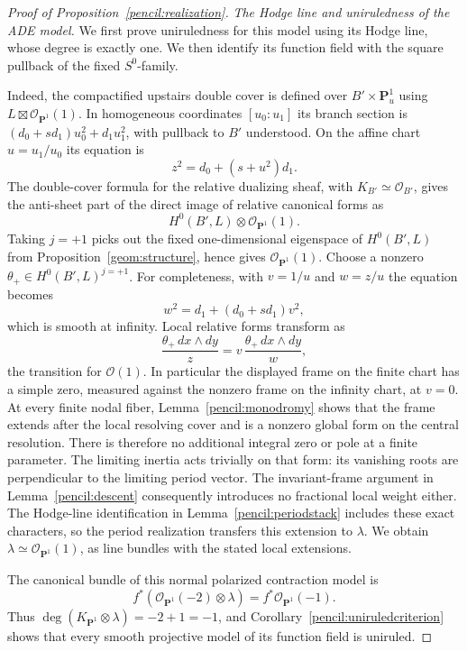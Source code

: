 \documentclass[11pt]{amsart}
\newcommand{\PP}{\mathbf P}
\theoremstyle{definition}
\theoremstyle{remark}
\numberwithin{equation}{section}
\begin{document}
\begin{proof}[Proof of Proposition~\ref{pencil:realization}]
\emph{The Hodge line and uniruledness of the ADE model.}
We first prove uniruledness for this model using its Hodge line, whose
degree is exactly one.  We then identify its function field with the
square pullback of the fixed \(S^0\)-family.

Indeed, the compactified
upstairs double cover is defined over \(B'\times\PP^1_u\) using
\(L\boxtimes\mathcal O_{\PP^1}(1)\).  In homogeneous coordinates
\([u_0:u_1]\) its branch section is
\((d_0+s d_1)u_0^2+d_1u_1^2\), with pullback to \(B'\) understood.
On the affine chart \(u=u_1/u_0\) its equation is
\[
 z^2=d_0+(s+u^2)d_1.
\]
The double-cover formula for the relative dualizing sheaf, with
\(K_{B'}\simeq\mathcal O_{B'}\), gives the anti-sheet part of the
direct image of relative canonical forms as
\[
 H^0(B',L)\otimes\mathcal O_{\PP^1}(1).
\]
Taking \(j=+1\) picks out the fixed one-dimensional eigenspace of
\(H^0(B',L)\) from Proposition~\ref{geom:structure}, hence gives
\(\mathcal O_{\PP^1}(1)\).
Choose a nonzero \(\theta_+\in H^0(B',L)^{j=+1}\).
For completeness, with \(v=1/u\) and \(w=z/u\) the equation becomes
\[
 w^2=d_1+(d_0+s d_1)v^2,
\]
which is smooth at infinity.  Local relative forms transform as
\[
 \frac{\theta_+\,dx\wedge dy}{z}
     =v\,\frac{\theta_+\,dx\wedge dy}{w},
\]
the transition for \(\mathcal O(1)\).  In particular the displayed
frame on the finite chart has a simple zero, measured against the
nonzero frame on the infinity chart, at \(v=0\).
At every finite nodal fiber, Lemma~\ref{pencil:monodromy} shows that
the frame extends after the local resolving cover and is a nonzero
global form on the central resolution.  There is therefore no
additional integral zero or pole at a finite parameter.  The limiting
inertia acts trivially on that form: its vanishing roots are
perpendicular to the limiting period vector.  The invariant-frame
argument in Lemma~\ref{pencil:descent} consequently introduces no
fractional local weight either.  The Hodge-line identification in
Lemma~\ref{pencil:periodstack} includes these exact characters, so
the period realization transfers this extension to \(\lambda\).
We obtain \(\lambda\simeq\mathcal O_{\PP^1}(1)\), as line bundles
with the stated local extensions.

The canonical bundle of this normal polarized contraction model is
\[
 f^*(\mathcal O_{\PP^1}(-2)\otimes\lambda)
      =f^*\mathcal O_{\PP^1}(-1).
\]
Thus \(\deg(K_{\PP^1}\otimes\lambda)=-2+1=-1\), and
Corollary~\ref{pencil:uniruledcriterion} shows that every smooth
projective model of its function field is uniruled.


\end{proof}
\end{document}
